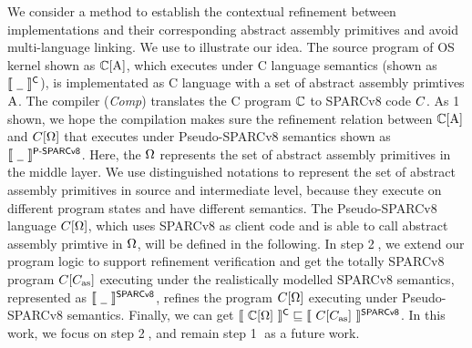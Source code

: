 We consider a method to establish the contextual 
refinement between implementations and their 
corresponding abstract assembly primitives and 
avoid multi-language linking. 
We use \Fig{\ref{fig:idea to establish contextual refinement}} 
to illustrate our idea. 
The source program of OS kernel  
shown as $\mathbb{C}[\text{A}]$, which executes
under C language semantics (shown as 
$\llbracket \ {\underline{\ \,}} \ \rrbracket^{\textsf{C}}$),   
is implementated as C language 
with a set of abstract assembly primtives $\text{A}$. 
The compiler (\textit{Comp}) translates the 
C program $\mathbb{C}$ to SPARCv8 code $C$. 
As {\color{blue} \textcircled{1}} shown, 
we hope the compilation makes sure the 
refinement relation between $\mathbb{C}[\text{A}]$ and 
$C[\Omega]$ that 
executes under Pseudo-SPARCv8 semantics shown as 
$\llbracket \ {\underline{\ \,}} \ \rrbracket^{\textsf{P-SPARCv8}}$. 
Here, the $\Omega$ represents the set of 
abstract assembly primitives in the middle layer. 
We use distinguished notations to represent 
the set of abstract assembly primitives in source 
and intermediate level, because they execute on 
different program states and have different semantics. 
The Pseudo-SPARCv8 language $C[\Omega]$,  
which uses SPARCv8 as client code and is able to 
call abstract assembly primtive in $\Omega$, 
will be defined in the following.
In step {\color{blue} \textcircled{2}},
we extend our program logic to support refinement 
verification and get the totally SPARCv8 program 
$C[C_{\text{as}}]$ executing under the realistically
modelled SPARCv8 semantics, represented as 
$\llbracket \ {\underline{\ \,}} \ \rrbracket^{\textsf{SPARCv8}}$, refines 
the program $C[\Omega]$ executing 
under Pseudo-SPARCv8 semantics.  
Finally, we can get 
$\llbracket \ {\mathbb{C}[\Omega]} \ \rrbracket^{\textsf{C}}
\sqsubseteq
\llbracket \ {C[C_{\text{as}}]} \ \rrbracket^{\textsf{SPARCv8}}$. 
In this work, we focus on 
step {\color{blue} \textcircled{2}}, and 
remain step {\color{blue} \textcircled{1}} 
as a future work. 

